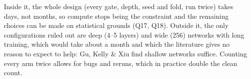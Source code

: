 \begin{whybox}
Inside it, the whole design (every gate, depth, seed and fold, run twice) takes days, not months, so
compute stops being the constraint and the remaining choices can be made on statistical grounds (Q17,
Q18). Outside it, the only configurations ruled out are deep (4--5 layers) and wide (256) networks with
long training, which would take about a month and which the literature gives no reason to expect to help:
Gu, Kelly \& Xiu find shallow networks suffice. Counting every arm twice allows for bugs and reruns, which
in practice double the clean count.
\end{whybox}

